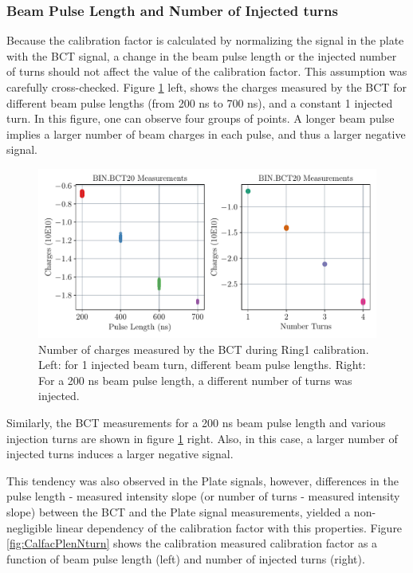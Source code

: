 \subsubsection{Beam Pulse Length and Number of Injected turns}

Because the calibration factor is calculated by normalizing the signal in the plate with the BCT signal, a change in the beam pulse length or the injected number of turns should not affect the value of the calibration factor.  This assumption was carefully cross-checked.
Figure \ref{fig:PulseLenghtNturns} left, shows the charges measured by the BCT for different beam pulse lengths (from 200 ns to 700 ns), and a constant 1 injected turn. In this figure, one can observe four groups of points. A longer beam pulse implies a larger number of beam charges in each pulse, and thus a larger negative signal. 

\begin{figure}[h]
    \centering
    \includegraphics[width=1.0\columnwidth]{Figure_BCT_PulseLength/BCT_TurnPulse.pdf}
    \caption{Number of charges measured by the BCT during Ring1 calibration. Left: for 1 injected beam turn, different beam pulse lengths. Right: For a 200 ns beam pulse length, a different number of turns was injected.}
    \label{fig:PulseLenghtNturns}
\end{figure}

Similarly, the BCT measurements for a 200 ns beam pulse length and various injection turns are shown in figure \ref{fig:PulseLenghtNturns} right. Also, in this case, a larger number of injected turns induces a larger negative signal. 

This tendency was also observed in the Plate signals, however, differences in the pulse length - measured intensity slope (or number of turns - measured intensity slope) between the BCT and the Plate signal measurements, yielded a non-negligible linear dependency of the calibration factor with this properties. Figure \ref{fig:CalfacPlenNturn} shows the calibration measured calibration factor as a function of beam pulse length (left) and number of injected turns (right).


